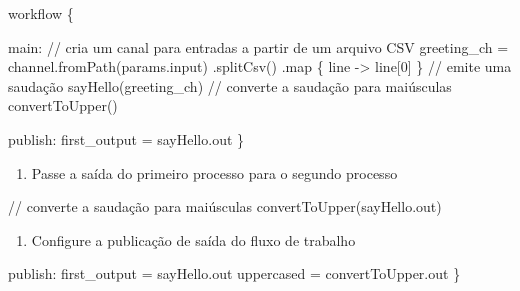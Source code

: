 \documentclass[
  brazilian,
  letterpaper,
  DIV=11,
  numbers=noendperiod]{scrreprt}
\newenvironment{Shaded}{\begin{snugshade}}{\end{snugshade}}
\newcommand{\CommentTok}[1]{\textcolor[rgb]{0.37,0.37,0.37}{#1}}
\newcommand{\DecValTok}[1]{\textcolor[rgb]{0.68,0.00,0.00}{#1}}
\newcommand{\FunctionTok}[1]{\textcolor[rgb]{0.28,0.35,0.67}{#1}}
\newcommand{\NormalTok}[1]{\textcolor[rgb]{0.00,0.23,0.31}{#1}}
\newcommand{\OperatorTok}[1]{\textcolor[rgb]{0.37,0.37,0.37}{#1}}
\providecommand{\tightlist}{%
  \setlength{\itemsep}{0pt}\setlength{\parskip}{0pt}}
\begin{document}
\begin{Shaded}
\begin{Highlighting}[]
\NormalTok{workflow }\OperatorTok{\{}

\NormalTok{    main}\OperatorTok{:}
    \CommentTok{// cria um canal para entradas a partir de um arquivo CSV}
\NormalTok{    greeting\_ch }\OperatorTok{=}\NormalTok{ channel}\OperatorTok{.}\FunctionTok{fromPath}\OperatorTok{(}\NormalTok{params}\OperatorTok{.}\NormalTok{input}\OperatorTok{)}
                        \OperatorTok{.}\FunctionTok{splitCsv}\OperatorTok{()}
                        \OperatorTok{.}\FunctionTok{map} \OperatorTok{\{}\NormalTok{ line }\OperatorTok{{-}\textgreater{}}\NormalTok{ line}\OperatorTok{[}\DecValTok{0}\OperatorTok{]} \OperatorTok{\}}
    \CommentTok{// emite uma saudação}
    \FunctionTok{sayHello}\OperatorTok{(}\NormalTok{greeting\_ch}\OperatorTok{)}
    \CommentTok{// converte a saudação para maiúsculas}
    \FunctionTok{convertToUpper}\OperatorTok{()}

\NormalTok{    publish}\OperatorTok{:}
\NormalTok{    first\_output }\OperatorTok{=}\NormalTok{ sayHello}\OperatorTok{.}\NormalTok{out}
\OperatorTok{\}}
\end{Highlighting}
\end{Shaded}

\begin{enumerate}
\def\labelenumi{\arabic{enumi}.}
\setcounter{enumi}{3}
\tightlist
\item
  Passe a saída do primeiro processo para o segundo processo
\end{enumerate}

\begin{Shaded}
\begin{Highlighting}[]
    \CommentTok{// converte a saudação para maiúsculas}
    \FunctionTok{convertToUpper}\OperatorTok{(}\NormalTok{sayHello}\OperatorTok{.}\NormalTok{out}\OperatorTok{)}
\end{Highlighting}
\end{Shaded}

\begin{enumerate}
\def\labelenumi{\arabic{enumi}.}
\setcounter{enumi}{4}
\tightlist
\item
  Configure a publicação de saída do fluxo de trabalho
\end{enumerate}

\begin{Shaded}
\begin{Highlighting}[]

\NormalTok{    publish}\OperatorTok{:}
\NormalTok{    first\_output }\OperatorTok{=}\NormalTok{ sayHello}\OperatorTok{.}\NormalTok{out}
\NormalTok{    uppercased }\OperatorTok{=}\NormalTok{ convertToUpper}\OperatorTok{.}\NormalTok{out}
\OperatorTok{\}}
\end{Highlighting}
\end{Shaded}
\end{document}

